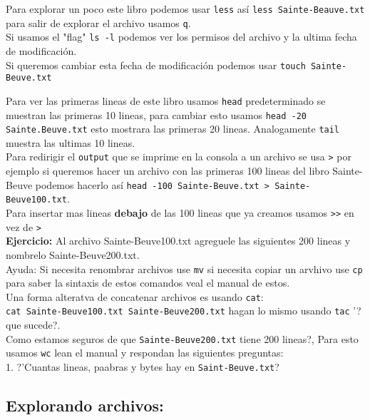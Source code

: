 \documentclass[12pt]{article}
\begin{document}
Para explorar un poco este libro podemos usar \verb+less+ as\'i \verb+less Sainte-Beauve.txt+ para salir de explorar el archivo usamos \verb+q+.\\

Si usamos el "flag" \verb+ls -l+ podemos ver los permisos del archivo y la ultima fecha de modificaci\'on.\\
Si queremos cambiar esta fecha de modificaci\'on podemos usar \verb+touch Sainte-Beuve.txt+

Para ver las primeras lineas de este libro usamos \verb+head+ predeterminado se muestran las primeras 10 lineas, 
para cambiar esto usamos \verb+head -20 Sainte.Beuve.txt+ esto mostrara las primeras 20 lineas. Analogamente 
\verb+tail+ muestra las ultimas 10 lineas.\\

Para redirigir el \verb+output+ que se imprime en la consola a un archivo se usa \verb+>+ por ejemplo si queremos
hacer un archivo con las primeras 100 lineas del libro Sainte-Beuve podemos hacerlo as\'i \verb+head -100 Sainte-Beuve.txt > Sainte-Beuve100.txt+.\\

Para insertar mas lineas \textbf{debajo} de las 100 lineas que ya creamos usamos \verb+>>+ en vez de \verb+>+\\ 

\textbf{Ejercicio:} Al archivo Sainte-Beuve100.txt agreguele las siguientes 200 lineas y nombrelo Sainte-Beuve200.txt.\\

Ayuda: Si necesita renombrar archivos use \verb+mv+ si necesita copiar un arvhivo use \verb+cp+ para saber la sintaxis 
de estos comandos veal el manual de estos.\\

Una forma alteratva de concatenar archivos es usando \verb+cat+:\\
\verb+cat Sainte-Beuve100.txt Sainte-Beuve200.txt+  hagan lo mismo usando \verb+tac+ '?que sucede?.\\

Como estamos seguros de que \verb+Sainte-Beuve200.txt+ tiene 200 lineas?, Para esto usamos \verb+wc+ lean 
el manual y respondan las siguientes preguntas:\\

1. ?'Cuantas lineas, paabras y bytes hay en \verb+Saint-Beuve.txt+?

\subsection{Explorando archivos:}
\end{document}
